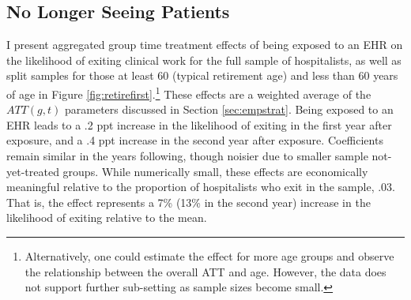 \documentclass[12pt]{article}
\begin{document}
\subsection{No Longer Seeing Patients}\label{sec:retire}


I present aggregated group time treatment effects of being exposed to an EHR on the likelihood of exiting clinical work for the full sample of hospitalists, as well as split samples for those at least 60 (typical retirement age) and less than 60 years of age in Figure \ref{fig:retirefirst}.\footnote{Alternatively, one could estimate the effect for more age groups and observe the relationship between the overall ATT and age. However, the data does not support further sub-setting as sample sizes become small.} These effects are a weighted average of the $ATT(g,t)$ parameters discussed in Section \ref{sec:empstrat}. Being exposed to an EHR leads to a .2 ppt increase in the likelihood of exiting in the first year after exposure, and a .4 ppt increase in the second year after exposure. Coefficients remain similar in the years following, though noisier due to smaller sample not-yet-treated groups. While numerically small, these effects are economically meaningful relative to the proportion of hospitalists who exit in the sample, .03. That is, the effect represents a 7\% (13\% in the second year) increase in the likelihood of exiting relative to the mean.   
\end{document}
